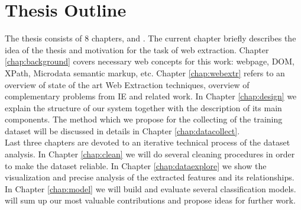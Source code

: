 \section{Thesis Outline}
The thesis consists of 8 chapters,  and . The current chapter briefly describes the idea of the thesis and motivation for the task of web extraction. Chapter \ref{chap:background} covers necessary web concepts for this work: webpage, DOM, XPath, Microdata semantic markup, etc. Chapter \ref{chap:webextr} refers to an overview of state of the art Web Extraction techniques, overview of complementary problems from IE and related work. In Chapter \ref{chap:design} we explain the structure of our system together with the description of its main components. The method which we propose for the collecting of the training dataset will be discussed in details in Chapter \ref{chap:datacollect}. \\

Last three chapters are devoted to an iterative technical process of the dataset analysis. In Chapter \ref{chap:clean} we will do several cleaning procedures in order to make the dataset reliable. In Chapter \ref{chap:dataexplore} we show the visualization and precise analysis of the extracted features and its relationships. In Chapter \ref{chap:model} we will build  and evaluate several classification models.  will sum up our most valuable contributions and propose ideas for further work.